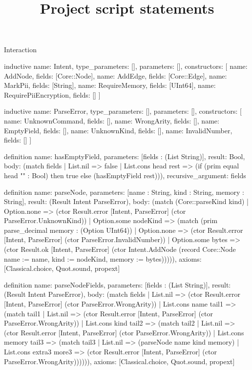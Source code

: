 \begin{lexlean}{Interaction}
\title{Project script statements}
\begin{semanticmodule}
inductive{
  name: Intent,
  type_parameters: [],
  parameters: [],
  constructors: [
    {name: AddNode, fields: [Core::Node]},
    {name: AddEdge, fields: [Core::Edge]},
    {name: MarkPii, fields: [String]},
    {name: RequireMemory, fields: [UInt64]},
    {name: RequirePiiEncryption, fields: []}
  ]
}

inductive{
  name: ParseError,
  type_parameters: [],
  parameters: [],
  constructors: [
    {name: UnknownCommand, fields: []},
    {name: WrongArity, fields: []},
    {name: EmptyField, fields: []},
    {name: UnknownKind, fields: []},
    {name: InvalidNumber, fields: []}
  ]
}

definition{
  name: hasEmptyField,
  parameters: [fields : (List String)],
  result: Bool,
  body: (match fields
    | List.nil => false
    | List.cons head rest => (if (prim equal head "" : Bool) then true else (hasEmptyField rest))),
  recursive_argument: fields
}

definition{
  name: parseNode,
  parameters: [name : String, kind : String, memory : String],
  result: (Result Intent ParseError),
  body: (match (Core::parseKind kind)
    | Option.none => (ctor Result.error [Intent, ParseError] (ctor ParseError.UnknownKind))
    | Option.some nodeKind => (match (prim parse_decimal memory : (Option UInt64))
      | Option.none => (ctor Result.error [Intent, ParseError] (ctor ParseError.InvalidNumber))
      | Option.some bytes => (ctor Result.ok [Intent, ParseError] (ctor Intent.AddNode (record Core::Node {name := name, kind := nodeKind, memory := bytes}))))),
  axioms: [Classical.choice, Quot.sound, propext]
}

definition{
  name: parseNodeFields,
  parameters: [fields : (List String)],
  result: (Result Intent ParseError),
  body: (match fields
    | List.nil => (ctor Result.error [Intent, ParseError] (ctor ParseError.WrongArity))
    | List.cons name tail1 => (match tail1
      | List.nil => (ctor Result.error [Intent, ParseError] (ctor ParseError.WrongArity))
      | List.cons kind tail2 => (match tail2
        | List.nil => (ctor Result.error [Intent, ParseError] (ctor ParseError.WrongArity))
        | List.cons memory tail3 => (match tail3
          | List.nil => (parseNode name kind memory)
          | List.cons extra3 more3 => (ctor Result.error [Intent, ParseError] (ctor ParseError.WrongArity)))))),
  axioms: [Classical.choice, Quot.sound, propext]
}


\end{semanticmodule}
\end{lexlean}
